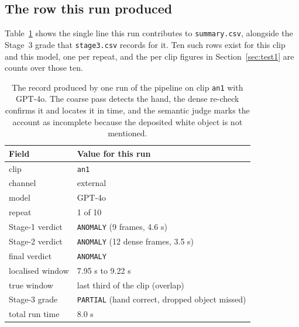 \subsection{The row this run produced}

Table~\ref{tab:worked-row} shows the single line this run contributes to
\texttt{summary.csv}, alongside the Stage~3 grade that
\texttt{stage3.csv} records for it. Ten such rows exist for this clip and
this model, one per repeat, and the per clip figures in
Section~\ref{sec:test1} are counts over those ten.

\begin{table}[h]
\centering
\small
\setlength{\tabcolsep}{7pt}
\begin{tabular}{@{}l l@{}}
\toprule
Field & Value for this run \\
\midrule
clip                & \texttt{an1} \\
channel             & external \\
model               & GPT-4o \\
repeat              & 1 of 10 \\
Stage-1 verdict     & \texttt{ANOMALY} (9 frames, 4.6 s) \\
Stage-2 verdict     & \texttt{ANOMALY} (12 dense frames, 3.5 s) \\
final verdict       & \texttt{ANOMALY} \\
localised window    & 7.95 s to 9.22 s \\
true window         & last third of the clip (overlap) \\
Stage-3 grade       & \texttt{PARTIAL} (hand correct, dropped object missed) \\
total run time      & 8.0 s \\
\bottomrule
\end{tabular}
\caption{The record produced by one run of the pipeline on clip
\texttt{an1} with GPT-4o. The coarse pass detects the hand, the dense
re-check confirms it and locates it in time, and the semantic judge marks
the account as incomplete because the deposited white object is not
mentioned.}
\label{tab:worked-row}
\end{table}
\FloatBarrier
